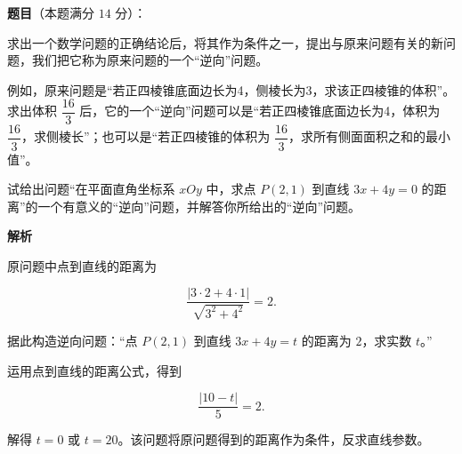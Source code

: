 \begin{answer}

\textbf{题目}（本题满分 $14$ 分）：

求出一个数学问题的正确结论后，将其作为条件之一，提出与原来问题有关的新问题，我们把它称为原来问题的一个“逆向”问题。

例如，原来问题是“若正四棱锥底面边长为4，侧棱长为3，求该正四棱锥的体积”。求出体积 $\dfrac{16}3$ 后，它的一个“逆向”问题可以是“若正四棱锥底面边长为4，体积为 $\dfrac{16}3$，求侧棱长”；也可以是“若正四棱锥的体积为 $\dfrac{16}3$，求所有侧面面积之和的最小值”。

试给出问题“在平面直角坐标系 $xOy$ 中，求点 $P(2,1)$ 到直线 $3x+4y=0$ 的距离”的一个有意义的“逆向”问题，并解答你所给出的“逆向”问题。

\textbf{解析}

原问题中点到直线的距离为

\nopagebreak[4]
\[
\frac{|3\cdot2+4\cdot1|}{\sqrt{3^2+4^2}}=2.
\]

据此构造逆向问题：“点 $P(2,1)$ 到直线 $3x+4y=t$ 的距离为 $2$，求实数 $t$。”

运用点到直线的距离公式，得到

\nopagebreak[4]
\[
\frac{|10-t|}{5}=2.
\]

解得 $t=0$ 或 $t=20$。该问题将原问题得到的距离作为条件，反求直线参数。


\end{answer}
